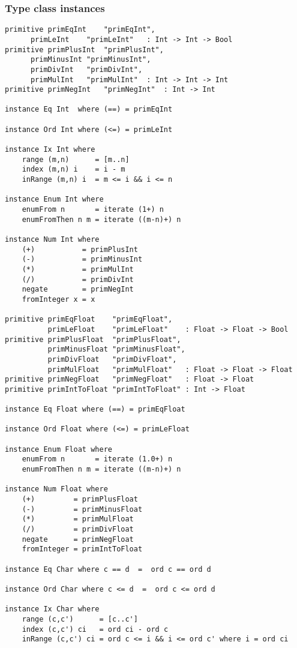\subsubsection*{Type class instances}
\begin{verbatim}
primitive primEqInt    "primEqInt",
	  primLeInt    "primLeInt"   : Int -> Int -> Bool
primitive primPlusInt  "primPlusInt",
	  primMinusInt "primMinusInt",
	  primDivInt   "primDivInt",
	  primMulInt   "primMulInt"  : Int -> Int -> Int
primitive primNegInt   "primNegInt"  : Int -> Int

instance Eq Int  where (==) = primEqInt

instance Ord Int where (<=) = primLeInt

instance Ix Int where
    range (m,n)      = [m..n]
    index (m,n) i    = i - m
    inRange (m,n) i  = m <= i && i <= n

instance Enum Int where
    enumFrom n       = iterate (1+) n
    enumFromThen n m = iterate ((m-n)+) n

instance Num Int where
    (+)           = primPlusInt
    (-)           = primMinusInt
    (*)           = primMulInt
    (/)           = primDivInt
    negate        = primNegInt
    fromInteger x = x

primitive primEqFloat    "primEqFloat",
          primLeFloat    "primLeFloat"    : Float -> Float -> Bool
primitive primPlusFloat  "primPlusFloat", 
          primMinusFloat "primMinusFloat", 
          primDivFloat   "primDivFloat",
          primMulFloat   "primMulFloat"   : Float -> Float -> Float 
primitive primNegFloat   "primNegFloat"   : Float -> Float
primitive primIntToFloat "primIntToFloat" : Int -> Float

instance Eq Float where (==) = primEqFloat

instance Ord Float where (<=) = primLeFloat

instance Enum Float where
    enumFrom n       = iterate (1.0+) n
    enumFromThen n m = iterate ((m-n)+) n

instance Num Float where
    (+)         = primPlusFloat
    (-)         = primMinusFloat
    (*)         = primMulFloat
    (/)         = primDivFloat 
    negate      = primNegFloat
    fromInteger = primIntToFloat

instance Eq Char where c == d  =  ord c == ord d

instance Ord Char where c <= d  =  ord c <= ord d

instance Ix Char where
    range (c,c')      = [c..c']
    index (c,c') ci   = ord ci - ord c
    inRange (c,c') ci = ord c <= i && i <= ord c' where i = ord ci


\end{verbatim}
